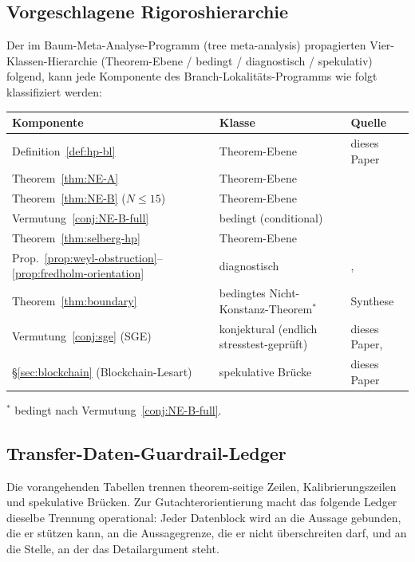 \documentclass[11pt]{article}
\theoremstyle{definition}
\theoremstyle{remark}
\begin{document}
\subsection{Vorgeschlagene Rigoroshierarchie}
\label{sec:rigor}

Der im Baum-Meta-Analyse-Programm (tree meta-analysis) propagierten Vier-Klassen-Hierarchie
(Theorem-Ebene / bedingt / diagnostisch / spekulativ) folgend, kann jede
Komponente des Branch-Lokalitäts-Programms wie folgt klassifiziert werden:

\begin{center}
\begin{tabular}{@{}lll@{}}
\toprule
Komponente & Klasse & Quelle \\
\midrule
Definition~\ref{def:hp-bl} & Theorem-Ebene & dieses Paper \\
Theorem~\ref{thm:NE-A} & Theorem-Ebene & \cite{Geiger2026RHII} \\
Theorem~\ref{thm:NE-B} ($N\leq 15$) & Theorem-Ebene & \cite{Geiger2026RHII} \\
Vermutung~\ref{conj:NE-B-full} & bedingt (conditional) & \cite{Geiger2026RHII} \\
Theorem~\ref{thm:selberg-hp} & Theorem-Ebene & \cite{Selberg1956} \\
Prop.~\ref{prop:weyl-obstruction}--\ref{prop:fredholm-orientation} & diagnostisch & \cite{Geiger2026RHIII}, \cite{MobiusGradedPrimeHub} \\
Theorem~\ref{thm:boundary} & bedingtes Nicht-Konstanz-Theorem${}^*$ & Synthese \\
Vermutung~\ref{conj:sge} (SGE) & konjektural (endlich stresstest-geprüft) & dieses Paper, \cite{SGENote} \\
\S\ref{sec:blockchain} (Blockchain-Lesart) & spekulative Brücke & dieses Paper \\
\bottomrule
\end{tabular}
\end{center}
${}^*$ bedingt nach Vermutung~\ref{conj:NE-B-full}.

\subsection{Transfer-Daten-Guardrail-Ledger}
\label{sec:transfer-data-ledger}

Die vorangehenden Tabellen trennen theorem-seitige Zeilen,
Kalibrierungszeilen und spekulative Brücken. Zur Gutachterorientierung
macht das folgende Ledger dieselbe Trennung operational: Jeder Datenblock
wird an die Aussage gebunden, die er stützen kann, an die Aussagegrenze,
die er nicht überschreiten darf, und an die Stelle, an der das Detailargument
steht.
\end{document}
